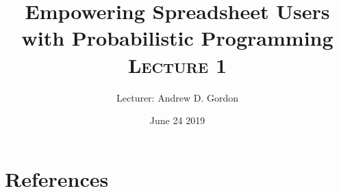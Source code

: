 \documentclass{article}
\title{Empowering Spreadsheet Users \\ with Probabilistic Programming \\ \textsc{Lecture 1}}
\author{Lecturer: Andrew D. Gordon}
\date{June 24 2019}
\begin{document}
\maketitle

\tableofcontents













\section{References}

\appendix

{}


\clearpage




\clearpage

\glsaddall
\printglossaries
\end{document}
